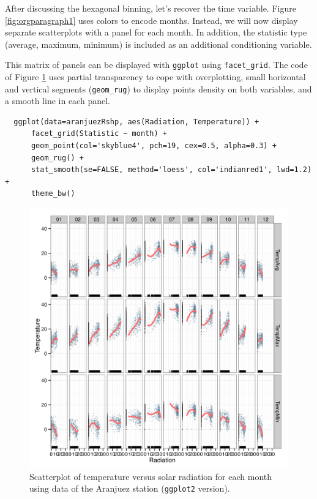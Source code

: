 After discussing the hexagonal binning, let's recover the time
variable. Figure \ref{fig:orgparagraph1} uses colors to encode
months. Instead, we will now display separate scatterplots with a
panel for each month. In addition, the statistic type (average,
maximum, minimum) is included as an additional conditioning variable.

This matrix of panels can be displayed with \texttt{ggplot} using
\texttt{facet\_grid}. The code of Figure \ref{fig:orgparagraph4} uses partial
transparency to cope with overplotting, small horizontal and vertical
segments (\texttt{geom\_rug}) to display points density on both variables, and
a smooth line in each panel.
\lstset{language=R,label= ,caption= ,captionpos=b,numbers=none}
\begin{lstlisting}
  ggplot(data=aranjuezRshp, aes(Radiation, Temperature)) +
      facet_grid(Statistic ~ month) +
      geom_point(col='skyblue4', pch=19, cex=0.5, alpha=0.3) +
      geom_rug() +
      stat_smooth(se=FALSE, method='loess', col='indianred1', lwd=1.2) +
      theme_bw()
\end{lstlisting}

\begin{figure}[htb]
\centering
\includegraphics[width=.9\linewidth]{figs/aranjuezFacetGrid.png}
\caption{\label{fig:orgparagraph4}
Scatterplot of temperature versus solar radiation for each month using data of the Aranjuez station (\texttt{ggplot2} version).}
\end{figure}

